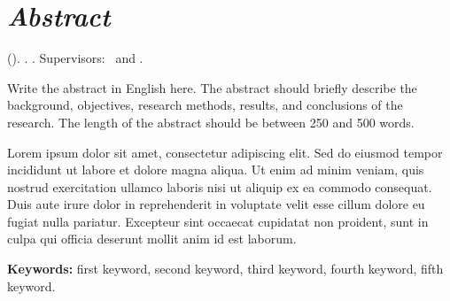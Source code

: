 
\chapter*{\textit{Abstract}}
\thispagestyle{plain}

\begin{abstrakenv}

\noindent
\textbf{\NamaMahasiswa} (\NIM). \textbf{\NamaProdi}.
\textit{\JudulTAEng}. Supervisors: \NamaPembimbing\ and \NamaPembimbingDua.

\vspace{0.5cm}

Write the abstract in English here. The abstract should briefly describe the background,
objectives, research methods, results, and conclusions of the research. The length of
the abstract should be between 250 and 500 words.

Lorem ipsum dolor sit amet, consectetur adipiscing elit. Sed do eiusmod tempor incididunt
ut labore et dolore magna aliqua. Ut enim ad minim veniam, quis nostrud exercitation
ullamco laboris nisi ut aliquip ex ea commodo consequat. Duis aute irure dolor in
reprehenderit in voluptate velit esse cillum dolore eu fugiat nulla pariatur.
Excepteur sint occaecat cupidatat non proident, sunt in culpa qui officia deserunt
mollit anim id est laborum.

\vspace{0.5cm}

\noindent
\textbf{Keywords:} first keyword, second keyword, third keyword, fourth keyword, fifth keyword.

\end{abstrakenv}
